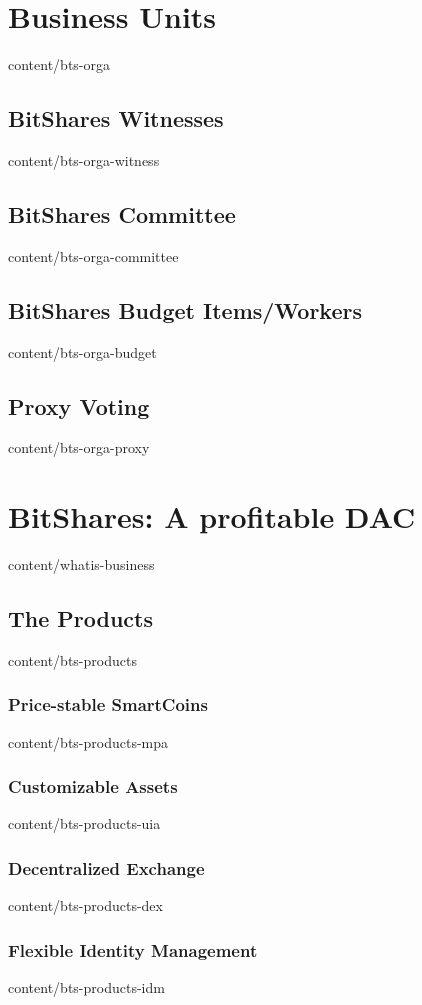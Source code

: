 \documentclass{btswhitepaper}
\begin{document}
\section       { Business Units                    }  { content/bts-orga            }
\subsection    { BitShares Witnesses               }  { content/bts-orga-witness    }
\subsection    { BitShares Committee               }  { content/bts-orga-committee  }
\subsection    { BitShares Budget Items/Workers    }  { content/bts-orga-budget     }
\subsection    { Proxy Voting                      }  { content/bts-orga-proxy      }

\section       { BitShares: A profitable DAC       }  { content/whatis-business     } 
\subsection    { The Products                      }  { content/bts-products        }
\subsubsection { Price-stable SmartCoins           }  { content/bts-products-mpa    }
\subsubsection { Customizable Assets               }  { content/bts-products-uia    }
\subsubsection { Decentralized Exchange            }  { content/bts-products-dex    }
\subsubsection { Flexible Identity Management      }  { content/bts-products-idm    }
\end{document}
